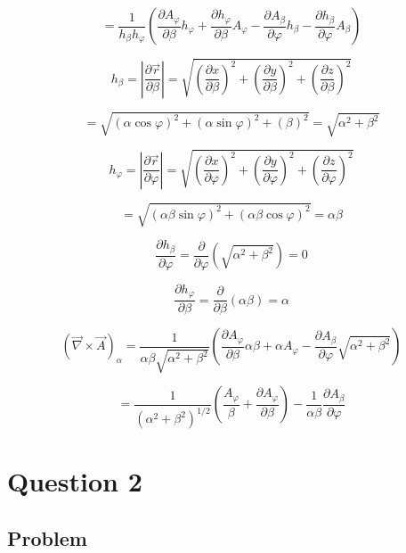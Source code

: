 \documentclass[12pt]{article}
\begin{document}
\[
    = \frac{1}{h_\beta h_\varphi}\left(\frac{\partial A_\varphi}{\partial \beta} h_\varphi + \frac{\partial h_\varphi}{\partial \beta} A_\varphi - \frac{\partial A_\beta}{\partial \varphi} h_\beta - \frac{\partial h_\beta}{\partial \varphi} A_\beta\right)
\]

\[
    h_\beta = \left\lvert \frac{\partial \vec{r}}{\partial \beta}\right\rvert
    = \sqrt{
    {\left(\frac{\partial x}{\partial \beta}\right)}^2
    + {\left(\frac{\partial y}{\partial \beta}\right)}^2
    + {\left(\frac{\partial z}{\partial \beta}\right)}^2
    }
\]

\[
    = \sqrt{
    {\left(\alpha \cos \varphi\right)}^2
    + {\left(\alpha \sin \varphi\right)}^2
    + {\left(\beta\right)}^2
    } = \sqrt{\alpha^2 + \beta^2}
\]

\[
    h_\varphi = \left\lvert \frac{\partial \vec{r}}{\partial \varphi}\right\rvert
    = \sqrt{
    {\left(\frac{\partial x}{\partial \varphi}\right)}^2
    + {\left(\frac{\partial y}{\partial \varphi}\right)}^2
    + {\left(\frac{\partial z}{\partial \varphi}\right)}^2
    }
\]

\[
    = \sqrt{
    {\left(\alpha \beta \sin \varphi\right)}^2
    + {\left(\alpha \beta \cos \varphi\right)}^2
    } = \alpha \beta
\]

\[
    \frac{\partial h_\beta}{\partial \varphi}
    = \frac{\partial}{\partial \varphi}\left(\sqrt{\alpha^2 + \beta^2}\right) = 0
\]

\[
    \frac{\partial h_\varphi}{\partial \beta}
    = \frac{\partial}{\partial \beta}\left(\alpha \beta\right) = \alpha
\]

\[
    {(\vec{\nabla} \times \vec{A})}_\alpha =
    \frac{1}{\alpha \beta \sqrt{\alpha^2 + \beta^2}}
    \left(
    \frac{\partial A_\varphi}{\partial \beta} \alpha \beta
    + \alpha A_\varphi
    - \frac{\partial A_\beta}{\partial \varphi} \sqrt{\alpha^2 + \beta^2}
    \right)
\]

\[
    = \frac{1}{{\left(\alpha^2+\beta^2\right)}^{1 / 2}}
    \left(
    \frac{A_{\varphi}}{\beta}
    + \frac{\partial A_\varphi}{\partial \beta}
    \right)-\frac{1}{\alpha \beta} \frac{\partial A_\beta}{\partial \varphi}
\]

\newpage
\section{Question 2}

\subsection{Problem}
\end{document}

